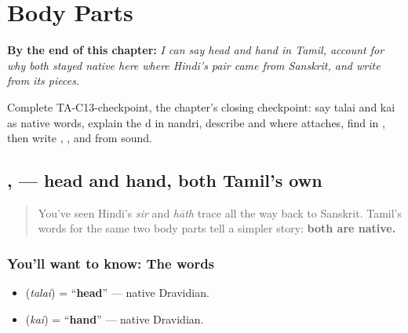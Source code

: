 
\chapter{Body Parts}
\label{ch:ta-body-parts}

\begin{chapteropening}
\textbf{By the end of this chapter:} \emph{I can say head and hand in Tamil, account for why both stayed native here where Hindi's pair came from Sanskrit, and write  from its pieces.}

Complete TA-C13-checkpoint, the chapter's closing checkpoint: say talai and kai as native words, explain the d in nandri, describe  and where  attaches, find  in , then write , ,  and  from sound.
\end{chapteropening}

\section[\texorpdfstring{\ta{தலை} \ta{கை} (talai kai)}{தலை கை (talai kai)}]{,  — head and hand, both Tamil's own}

\label{lesson:TA-C13-udal-uruppugal}



\begin{quote}
You've seen Hindi's \emph{sir} and \emph{hāth} trace all the way back to Sanskrit. Tamil's words for the same two body parts tell a simpler story: \textbf{both are native.}
\end{quote}

\subsection*{You'll want to know: The words}
\begin{itemize}
\raggedright
  \item \textbf{} (\emph{talai}) = \textquotedblleft{}\textbf{head}\textquotedblright{} — native Dravidian.
  \item \textbf{} (\emph{kai}) = \textquotedblleft{}\textbf{hand}\textquotedblright{} — native Dravidian.
\end{itemize}

